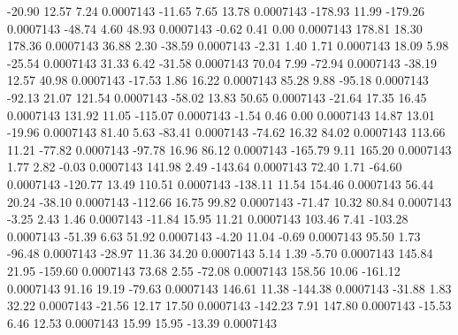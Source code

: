       -20.90       12.57        7.24     0.0007143
      -11.65        7.65       13.78     0.0007143
     -178.93       11.99     -179.26     0.0007143
      -48.74        4.60       48.93     0.0007143
       -0.62        0.41        0.00     0.0007143
      178.81       18.30      178.36     0.0007143
       36.88        2.30      -38.59     0.0007143
       -2.31        1.40        1.71     0.0007143
       18.09        5.98      -25.54     0.0007143
       31.33        6.42      -31.58     0.0007143
       70.04        7.99      -72.94     0.0007143
      -38.19       12.57       40.98     0.0007143
      -17.53        1.86       16.22     0.0007143
       85.28        9.88      -95.18     0.0007143
      -92.13       21.07      121.54     0.0007143
      -58.02       13.83       50.65     0.0007143
      -21.64       17.35       16.45     0.0007143
      131.92       11.05     -115.07     0.0007143
       -1.54        0.46        0.00     0.0007143
       14.87       13.01      -19.96     0.0007143
       81.40        5.63      -83.41     0.0007143
      -74.62       16.32       84.02     0.0007143
      113.66       11.21      -77.82     0.0007143
      -97.78       16.96       86.12     0.0007143
     -165.79        9.11      165.20     0.0007143
        1.77        2.82       -0.03     0.0007143
      141.98        2.49     -143.64     0.0007143
       72.40        1.71      -64.60     0.0007143
     -120.77       13.49      110.51     0.0007143
     -138.11       11.54      154.46     0.0007143
       56.44       20.24      -38.10     0.0007143
     -112.66       16.75       99.82     0.0007143
      -71.47       10.32       80.84     0.0007143
       -3.25        2.43        1.46     0.0007143
      -11.84       15.95       11.21     0.0007143
      103.46        7.41     -103.28     0.0007143
      -51.39        6.63       51.92     0.0007143
       -4.20       11.04       -0.69     0.0007143
       95.50        1.73      -96.48     0.0007143
      -28.97       11.36       34.20     0.0007143
        5.14        1.39       -5.70     0.0007143
      145.84       21.95     -159.60     0.0007143
       73.68        2.55      -72.08     0.0007143
      158.56       10.06     -161.12     0.0007143
       91.16       19.19      -79.63     0.0007143
      146.61       11.38     -144.38     0.0007143
      -31.88        1.83       32.22     0.0007143
      -21.56       12.17       17.50     0.0007143
     -142.23        7.91      147.80     0.0007143
      -15.53        6.46       12.53     0.0007143
       15.99       15.95      -13.39     0.0007143
